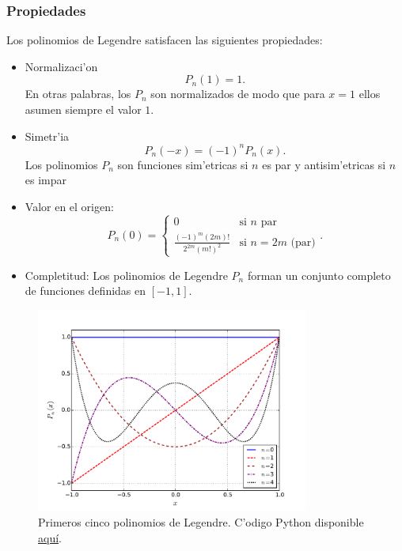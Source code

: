 \subsubsection{Propiedades}
Los polinomios de Legendre satisfacen las siguientes propiedades:
\begin{itemize}
\item Normalizaci'on
\begin{equation}
     P_n(1) = 1.
\end{equation}
En otras palabras, los $P_n$ son normalizados de modo que para $x=1$ ellos
asumen siempre el valor $1$.
 \item Simetr'ia
\begin{equation}
P_n(-x) = (-1)^n P_n(x).
\end{equation}
Los polinomios $P_n$ son funciones sim'etricas si $n$ es par y antisim'etricas
si $n$ es impar

\item Valor en el origen:
\begin{equation}\label{Pn0}
P_n(0)=\left\{\begin{array}{cl}
0 & \text{si } n \text{ par} \\
\frac{(-1)^m(2m)!}{2^{2m}(m!)^2} & \text{si } n=2m \text{ (par)}
\end{array}\right. .
\end{equation}

\item Completitud: Los polinomios de Legendre $P_n$ forman un conjunto
completo de funciones definidas en $[-1,1]$.
 \end{itemize}

\begin{figure}[H]
\centering
\includegraphics[angle=0,width=0.8\textwidth]{figs/fig-Legendre-P.pdf}
\caption{Primeros cinco polinomios de Legendre. C'odigo Python disponible \href{https://github.com/gfrubi/FM2/blob/master/figuras-editables/fig-Legendre.py}{aqu\'i}.}
\label{fig-Pn}
\end{figure}

